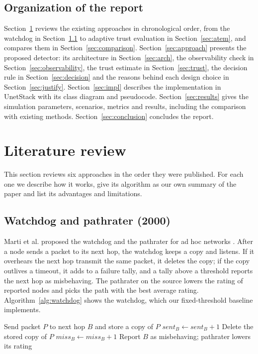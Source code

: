\documentclass{article}
\begin{document}
\subsection{Organization of the report}\label{sec:organization}
\noindent
Section~\ref{sec:litreview} reviews the existing approaches in chronological order, from the watchdog in Section~\ref{sec:watchdog} to adaptive trust evaluation in Section~\ref{sec:atem}, and compares them in Section~\ref{sec:comparison}. Section~\ref{sec:approach} presents the proposed detector: its architecture in Section~\ref{sec:arch}, the observability check in Section~\ref{sec:observability}, the trust estimate in Section~\ref{sec:trust}, the decision rule in Section~\ref{sec:decision} and the reasons behind each design choice in Section~\ref{sec:justify}. Section~\ref{sec:impl} describes the implementation in UnetStack with its class diagram and pseudocode. Section~\ref{sec:results} gives the simulation parameters, scenarios, metrics and results, including the comparison with existing methods. Section~\ref{sec:conclusion} concludes the report.

\section{Literature review}\label{sec:litreview}
\noindent
This section reviews six approaches in the order they were published. For each one we describe how it works, give its algorithm as our own summary of the paper and list its advantages and limitations.

\subsection{Watchdog and pathrater (2000)}\label{sec:watchdog}
\noindent
Marti et al. proposed the watchdog and the pathrater for ad hoc networks \cite{marti2000}. After a node sends a packet to its next hop, the watchdog keeps a copy and listens. If it overhears the next hop transmit the same packet, it deletes the copy; if the copy outlives a timeout, it adds to a failure tally, and a tally above a threshold reports the next hop as misbehaving. The pathrater on the source lowers the rating of reported nodes and picks the path with the best average rating. Algorithm~\ref{alg:watchdog} shows the watchdog, which our fixed-threshold baseline implements.

\begin{algorithm}[htbp]
\small
\caption{Watchdog at a sending node}\label{alg:watchdog}
\begin{algorithmic}[1]
\State Send packet $P$ to next hop $B$ and store a copy of $P$
\State $\mathit{sent}_B \gets \mathit{sent}_B + 1$
  \State Delete the stored copy of $P$
\Else
  \State $\mathit{miss}_B \gets \mathit{miss}_B + 1$ 
\EndIf
{}
  \State Report $B$ as misbehaving; pathrater lowers its rating
\EndIf
\end{algorithmic}
\end{algorithm}
\end{document}
